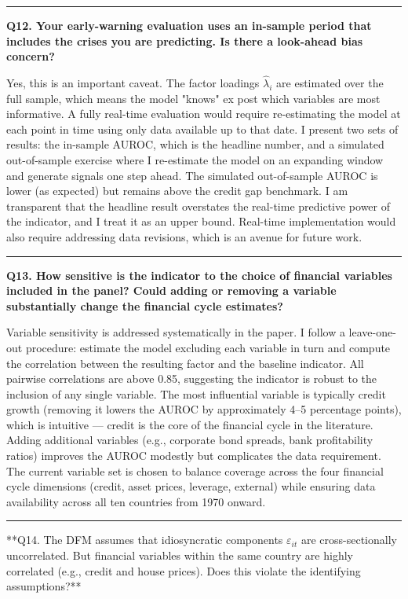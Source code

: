 \documentclass[11pt,a4paper]{article}
\begin{document}
\medskip\hrule\medskip

\textbf{Q12. Your early-warning evaluation uses an in-sample period that includes the crises you are predicting. Is there a look-ahead bias concern?}

Yes, this is an important caveat. The factor loadings $\hat{\lambda}_i$ are estimated over the full sample, which means the model "knows" ex post which variables are most informative. A fully real-time evaluation would require re-estimating the model at each point in time using only data available up to that date. I present two sets of results: the in-sample AUROC, which is the headline number, and a simulated out-of-sample exercise where I re-estimate the model on an expanding window and generate signals one step ahead. The simulated out-of-sample AUROC is lower (as expected) but remains above the credit gap benchmark. I am transparent that the headline result overstates the real-time predictive power of the indicator, and I treat it as an upper bound. Real-time implementation would also require addressing data revisions, which is an avenue for future work.

\medskip\hrule\medskip

\textbf{Q13. How sensitive is the indicator to the choice of financial variables included in the panel? Could adding or removing a variable substantially change the financial cycle estimates?}

Variable sensitivity is addressed systematically in the paper. I follow a leave-one-out procedure: estimate the model excluding each variable in turn and compute the correlation between the resulting factor and the baseline indicator. All pairwise correlations are above 0.85, suggesting the indicator is robust to the inclusion of any single variable. The most influential variable is typically credit growth (removing it lowers the AUROC by approximately 4–5 percentage points), which is intuitive — credit is the core of the financial cycle in the literature. Adding additional variables (e.g., corporate bond spreads, bank profitability ratios) improves the AUROC modestly but complicates the data requirement. The current variable set is chosen to balance coverage across the four financial cycle dimensions (credit, asset prices, leverage, external) while ensuring data availability across all ten countries from 1970 onward.

\medskip\hrule\medskip

**Q14. The DFM assumes that idiosyncratic components $\varepsilon_{it}$ are cross-sectionally uncorrelated. But financial variables within the same country are highly correlated (e.g., credit and house prices). Does this violate the identifying assumptions?**
\end{document}
